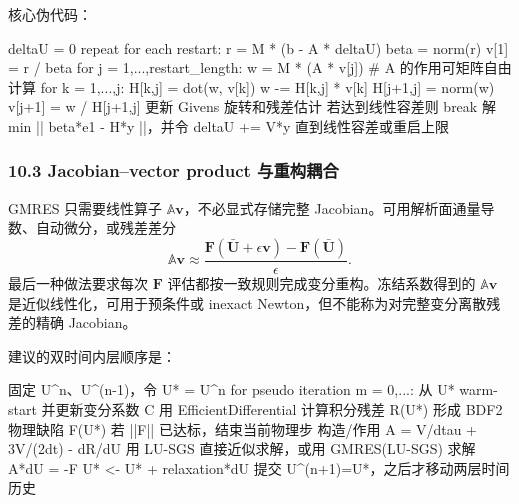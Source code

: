 \documentclass[
  12pt,
  UTF8]{ctexart}
\newenvironment{Shaded}{}{}
\newcommand{\NormalTok}[1]{#1}
\begin{document}
核心伪代码：

\begin{Shaded}
\begin{Highlighting}[]
\NormalTok{deltaU = 0}
\NormalTok{repeat for each restart:}
\NormalTok{    r = M * (b {-} A * deltaU)}
\NormalTok{    beta = norm(r)}
\NormalTok{    v[1] = r / beta}
\NormalTok{    for j = 1,...,restart\_length:}
\NormalTok{        w = M * (A * v[j])       \# A 的作用可矩阵自由计算}
\NormalTok{        for k = 1,...,j:}
\NormalTok{            H[k,j] = dot(w, v[k])}
\NormalTok{            w {-}= H[k,j] * v[k]}
\NormalTok{        H[j+1,j] = norm(w)}
\NormalTok{        v[j+1] = w / H[j+1,j]}
\NormalTok{        更新 Givens 旋转和残差估计}
\NormalTok{        若达到线性容差则 break}
\NormalTok{    解 min || beta*e1 {-} H*y ||，并令 deltaU += V*y}
\NormalTok{直到线性容差或重启上限}
\end{Highlighting}
\end{Shaded}

\hypertarget{jacobianvector-product-ux4e0eux91cdux6784ux8026ux5408}{%
\subsubsection{10.3 Jacobian--vector product
与重构耦合}\label{jacobianvector-product-ux4e0eux91cdux6784ux8026ux5408}}

GMRES 只需要线性算子 \(\mathbb A\boldsymbol v\)，不必显式存储完整
Jacobian。可用解析面通量导数、自动微分，或残差差分 \begin{equation}
\mathbb A\boldsymbol v\approx
\frac{\boldsymbol F(\bar{\boldsymbol U}+\epsilon\boldsymbol v)-
\boldsymbol F(\bar{\boldsymbol U})}{\epsilon}.\end{equation} 最后一种做法要求每次 \(\boldsymbol F\)
评估都按一致规则完成变分重构。冻结系数得到的 \(\mathbb A\boldsymbol v\)
是近似线性化，可用于预条件或 inexact
Newton，但不能称为对完整变分离散残差的精确 Jacobian。

建议的双时间内层顺序是：

\begin{Shaded}
\begin{Highlighting}[]
\NormalTok{固定 U\^{}n、U\^{}(n{-}1)，令 U* = U\^{}n}
\NormalTok{for pseudo iteration m = 0,...:}
\NormalTok{    从 U* warm{-}start 并更新变分系数 C}
\NormalTok{    用 EfficientDifferential 计算积分残差 R(U*)}
\NormalTok{    形成 BDF2 物理缺陷 F(U*)}
\NormalTok{    若 ||F|| 已达标，结束当前物理步}
\NormalTok{    构造/作用 A = V/dtau + 3V/(2dt) {-} dR/dU}
\NormalTok{    用 LU{-}SGS 直接近似求解，或用 GMRES(LU{-}SGS) 求解 A*dU = {-}F}
\NormalTok{    U* \textless{}{-} U* + relaxation*dU}
\NormalTok{提交 U\^{}(n+1)=U*，之后才移动两层时间历史}
\end{Highlighting}
\end{Shaded}
\end{document}
